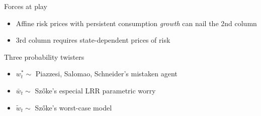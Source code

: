\documentclass{beamer}
\theoremstyle{Definition}
\begin{document}
\begin{frame}{Forces at play}
\begin{itemize}
\item Affine risk prices with persistent consumption \emph{growth} can nail the 2nd column
\item 3rd column requires state-dependent  prices of risk
\end{itemize}



\end{frame}
%
%
%
%
%



\begin{frame}{Three probability twisters }

\begin{itemize}
\item $w^*_t \sim $ Piazzesi, Salomao, Schneider's mistaken agent
\item $\bar w_t \sim $ Sz\H{o}ke's especial LRR parametric worry
\item $\tilde w_t \sim $ Sz\H{o}ke's worst-case model
\end{itemize}

\end{frame}
\end{document}
